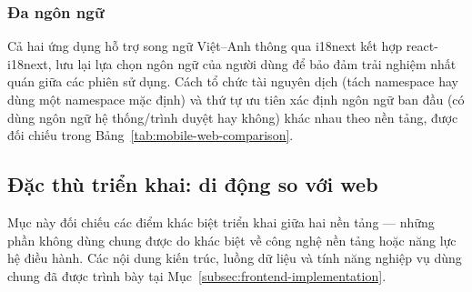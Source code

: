 \subsubsection{Đa ngôn ngữ}
\label{subsubsec:frontend-i18n}

Cả hai ứng dụng hỗ trợ song ngữ Việt--Anh thông qua i18next kết hợp react-i18next, lưu lại lựa chọn ngôn ngữ của người dùng để bảo đảm trải nghiệm nhất quán giữa các phiên sử dụng. Cách tổ chức tài nguyên dịch (tách namespace hay dùng một namespace mặc định) và thứ tự ưu tiên xác định ngôn ngữ ban đầu (có dùng ngôn ngữ hệ thống/trình duyệt hay không) khác nhau theo nền tảng, được đối chiếu trong Bảng~\ref{tab:mobile-web-comparison}.

\subsection{Đặc thù triển khai: di động so với web}
\label{subsec:mobile-specific}

Mục này đối chiếu các điểm khác biệt triển khai giữa hai nền tảng — những phần không dùng chung được do khác biệt về công nghệ nền tảng hoặc năng lực hệ điều hành. Các nội dung kiến trúc, luồng dữ liệu và tính năng nghiệp vụ dùng chung đã được trình bày tại Mục~\ref{subsec:frontend-implementation}.

